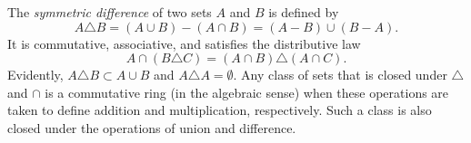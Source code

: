 The \emph{symmetric difference} of two sets $A$ and $B$ is defined by
$$A \triangle B = (A \cup B) - (A \cap B) = (A - B) \cup (B - A).$$
It is commutative, associative, and satisfies the distributive law
$$A \cap (B \triangle C) = (A \cap B) \triangle (A \cap C).$$
Evidently, $A \triangle B \subset A \cup B$ and $A \triangle A = \emptyset$. Any class of sets that is closed under $\triangle$ and $\cap$ is a commutative ring (in the algebraic sense) when these operations are taken to define addition and multiplication, respectively. Such a class is also closed under the operations of union and difference.
